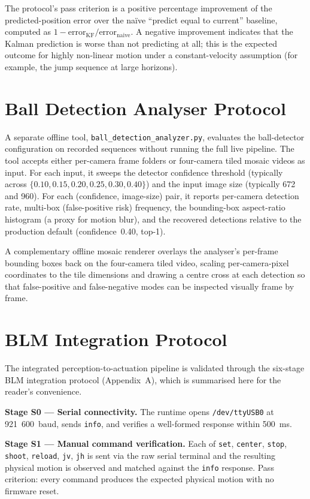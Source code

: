 The protocol's pass criterion is a positive percentage improvement of the predicted-position error over the na\"{i}ve ``predict equal to current'' baseline, computed as $1 - \mathrm{error}_{\text{KF}} / \mathrm{error}_{\text{naive}}$. A negative improvement indicates that the Kalman prediction is worse than not predicting at all; this is the expected outcome for highly non-linear motion under a constant-velocity assumption (for example, the jump sequence at large horizons).

\section{Ball Detection Analyser Protocol}

A separate offline tool, \texttt{ball\_detection\_analyzer.py}, evaluates the ball-detector configuration on recorded sequences without running the full live pipeline. The tool accepts either per-camera frame folders or four-camera tiled mosaic videos as input. For each input, it sweeps the detector confidence threshold (typically across $\{0.10, 0.15, 0.20, 0.25, 0.30, 0.40\}$) and the input image size (typically 672 and 960). For each (confidence, image-size) pair, it reports per-camera detection rate, multi-box (false-positive risk) frequency, the bounding-box aspect-ratio histogram (a proxy for motion blur), and the recovered detections relative to the production default (confidence~0.40, top-1).

A complementary offline mosaic renderer overlays the analyser's per-frame bounding boxes back on the four-camera tiled video, scaling per-camera-pixel coordinates to the tile dimensions and drawing a centre cross at each detection so that false-positive and false-negative modes can be inspected visually frame by frame.

\section{BLM Integration Protocol}

The integrated perception-to-actuation pipeline is validated through the six-stage BLM integration protocol (Appendix~A), which is summarised here for the reader's convenience.

\textbf{Stage S0 --- Serial connectivity.} The runtime opens \texttt{/dev/ttyUSB0} at 921~600~baud, sends \texttt{info}, and verifies a well-formed response within 500~ms.

\textbf{Stage S1 --- Manual command verification.} Each of \texttt{set}, \texttt{center}, \texttt{stop}, \texttt{shoot}, \texttt{reload}, \texttt{jv}, \texttt{jh} is sent via the raw serial terminal and the resulting physical motion is observed and matched against the \texttt{info} response. Pass criterion: every command produces the expected physical motion with no firmware reset.

